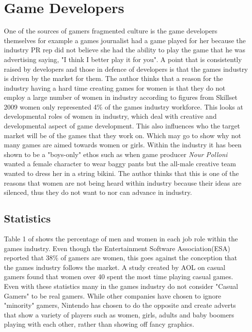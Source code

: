 \documentclass[11pt]{scrartcl}
\begin{document}
\section{Game Developers}
One of the sources of gamers fragmented culture is the game developers themselves for example a games journalist had a game played for her because the industry PR rep did not believe she had the ability to play the game that he was advertising saying, "I think I better play it for you"\cite{consalvo2012confronting}. A point that is consistently raised by developers and those in defence of developers is that the games industry is driven by the market for them.\cite{fron2007hegemony} The author thinks that a reason for the industry having a hard time creating games for women is that they do not employ a large number of women in industry according to figures from Skillset 2009 women only represented 4\% of the games industry workforce.\cite{skillset_2009} This looks at developmental roles of women in industry, which deal with creative and developmental aspect of game development. This also influences who the target market will be of the games that they work on.\cite{prescott2011segregation} Which may go to show why not many games are aimed towards women or girls. Within the industry it has been shown to be a "boys-only" ethos such as when game producer \emph{Nour Polloni} wanted a female character to wear baggy pants but the all-male creative team wanted to dress her in a string bikini. The author thinks that this is one of the reasons that women are not being heard within industry because their ideas are silenced, thus they do not want to nor can advance in industry.

\subsection{Statistics}
Table 1 of \cite{prescott2011segregation} shows the percentage of men and women in each job role within the games industry. Even though the Entertainment Software Association(ESA) reported that 38\% of gamers are women, this goes against the conception that the games industry follows the market\cite{fron2007hegemony}. A study created by AOL on casual gamers found that women over 40 spent the most time playing casual games.\cite{pearce2008truth} Even with these statistics many in the games industry do not consider "Casual Gamers" to be real gamers. While other companies have chosen to ignore "minority" gamers, Nintendo has chosen to do the opposite and create adverts that show a variety of players such as women, girls, adults and baby boomers playing with each other, rather than showing off fancy graphics.\cite{surowiecki_2017}




\end{document}
